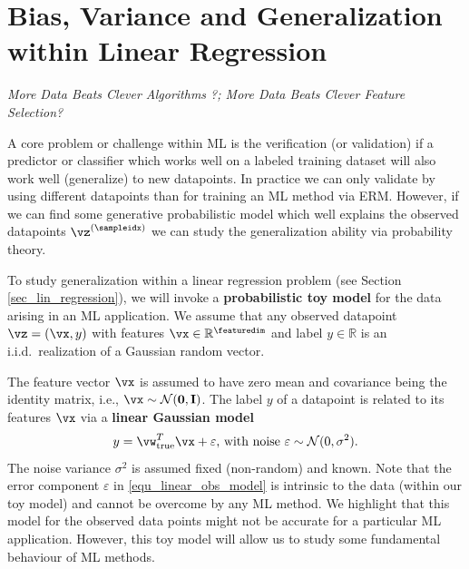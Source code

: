 \documentclass[12pt]{report}
\begin{document}
\section{Bias, Variance and Generalization within Linear Regression} 
\label{sec_gen_linreg}
\emph{More Data Beats Clever Algorithms ?; More Data Beats Clever Feature Selection?}

A core problem or challenge within ML is the verification (or validation) if a 
predictor or classifier which works well on a labeled training dataset will also 
work well (generalize) to new datapoints. In practice we can only validate 
by using different datapoints than for training an ML method via ERM. However, 
if we can find some generative probabilistic model which well explains the 
observed datapoints $\vz^{(\sampleidx)}$ we can study the generalization 
ability via probability theory. 

To study generalization within a linear regression problem 
(see Section \ref{sec_lin_regression}), we will invoke a {\bf probabilistic toy model} 
for the data arising in an ML application. We assume that 
any observed datapoint $\vz=(\vx,y)$ with features $\vx \in \mathbb{R}^{\featuredim}$ 
and label $y \in \mathbb{R}$ is an i.i.d.\ realization of a 
Gaussian random vector. 

The feature vector $\vx$ is assumed to have zero mean and covariance 
being the identity matrix, i.e., $\vx \sim \mathcal{N}(\mathbf{0}, \mathbf{I})$. 
The label $y$ of a datapoint is related to its features $\vx$ via a 
{\bf linear Gaussian model} 
\begin{equation} 
\label{equ_linear_obs_model}
y = \vw_{\rm true}^{T}  \vx + \varepsilon \mbox{, with noise } \varepsilon \sim \mathcal{N}(0,\sigma^{2}).
\end{equation} 
The noise variance $\sigma^{2}$ is assumed fixed (non-random) and known. 
Note that the error component $\varepsilon$ in \eqref{equ_linear_obs_model} 
is intrinsic to the data (within our toy model) and cannot be overcome by 
any ML method. We highlight that this model for the observed data 
points might not be accurate for a particular ML application. However, 
this toy model will allow us to study some fundamental behaviour of ML methods. 
\end{document}
